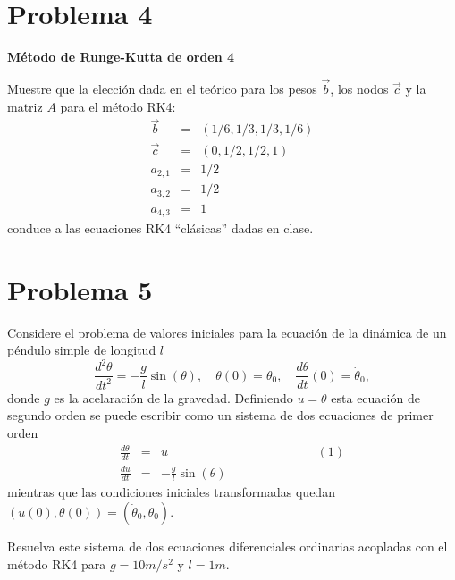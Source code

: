 \documentclass[11pt]{article}
\begin{document}
    \hypertarget{problema-4}{%
\section*{Problema 4}\label{problema-4}}

\textbf{Método de Runge-Kutta de orden 4}

Muestre que la elección dada en el teórico para los pesos \(\vec{b}\),
los nodos \(\vec{c}\) y la matriz \(A\) para el método RK4:
\begin{eqnarray}
\vec{b}&=&(1/6,1/3,1/3,1/6) \\
\vec{c}&=&(0,1/2,1/2,1) \\
a_{2,1}&=&1/2 \\
a_{3,2}&=&1/2 \\
a_{4,3}&=&1
\end{eqnarray} conduce a las ecuaciones RK4 ``clásicas'' dadas en clase.

    \hypertarget{problema-5}{%
\section*{Problema 5}\label{problema-5}}

Considere el problema de valores iniciales para la ecuación de la
dinámica de un péndulo simple de longitud \(l\) \[
\frac{d^2\theta}{d t^2} = - \frac{g}{l} \sin{(\theta)}, \quad
\theta(0)=\theta_0, \quad \frac{d\theta}{d t}(0)= \dot{\theta}_0,
\] donde \(g\) es la acelaración de la gravedad. Definiendo
\(u= \dot{\theta}\) esta ecuación de segundo orden se puede escribir
como un sistema de dos ecuaciones de primer orden \begin{eqnarray}
\frac{d\theta}{d t} &=& u \hspace{5cm} (1)\\
\frac{d u}{d t} &=& - \frac{g}{l} \sin{(\theta)}
\end{eqnarray} mientras que las condiciones iniciales transformadas
quedan \((u(0),\theta(0))=(\dot{\theta}_0,\theta_0)\).

Resuelva este sistema de dos ecuaciones diferenciales ordinarias
acopladas con el método RK4 para \(g=10 m/s^2\) y \(l=1 m\).
\end{document}
